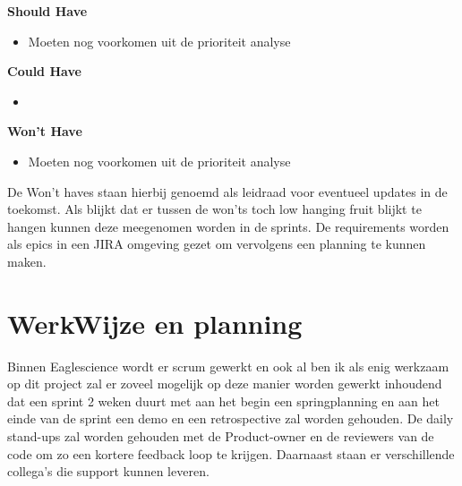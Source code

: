 \textbf{Should Have}
\begin{itemize}
  \item Moeten nog voorkomen uit de prioriteit analyse
\end{itemize}

\textbf{Could Have}
\begin{itemize}
\item
\end{itemize}

\textbf{Won't Have}
\begin{itemize}
  \item Moeten nog voorkomen uit de prioriteit analyse
\end{itemize}
De Won't haves staan hierbij genoemd als leidraad voor eventueel updates in de toekomst.
Als blijkt dat er tussen de won'ts toch low hanging fruit blijkt te hangen kunnen deze meegenomen worden in de sprints.
De requirements worden als epics in een JIRA omgeving gezet om vervolgens een planning te kunnen maken.


\section{WerkWijze en planning}\label{sec:werkwijze-en-planning}
Binnen Eaglescience wordt er scrum gewerkt en ook al ben ik als enig werkzaam op dit project zal er zoveel mogelijk op deze manier worden gewerkt inhoudend dat een sprint 2 weken duurt met aan het begin een springplanning en aan het einde van de sprint een demo en een retrospective zal worden gehouden.
De daily stand-ups zal worden gehouden met de Product-owner en de reviewers van de code om zo een kortere feedback loop te krijgen.
Daarnaast staan er verschillende collega's die support kunnen leveren.
